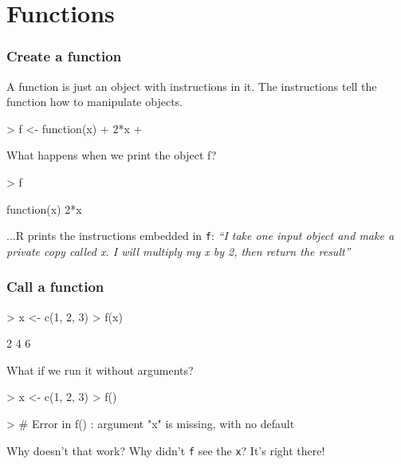 \documentclass{beamer}
\newcommand{\R}[1]{\texttt{#1}}
\begin{document}
\section{Functions}
\begin{frame}[fragile]
\frametitle{Create a function}
A function is just an object with instructions in it. The instructions tell the function how to manipulate objects.
\begin{Schunk}
\begin{Sinput}
> f <- function(x) {
+     2*x
+ }
\end{Sinput}
\end{Schunk}
\pause
What happens when we print the object f?
\begin{Schunk}
\begin{Sinput}
> f
\end{Sinput}
\end{Schunk}
\pause
\begin{Schunk}
\begin{Soutput}
function(x) {
    2*x
}
\end{Soutput}
\end{Schunk}
...R prints the instructions embedded in \R{f}: \textit{``I take one input object and make a private copy called x. I will multiply my x by 2, then return the result''}
\end{frame}


\begin{frame}[fragile]
\frametitle{Call a function}
\begin{Schunk}
\begin{Sinput}
> x <- c(1, 2, 3)
> f(x)
\end{Sinput}
\end{Schunk}
\pause
\begin{Schunk}
\begin{Soutput}
[1] 2 4 6
\end{Soutput}
\end{Schunk}
\pause
What if we run it without arguments?
\begin{Schunk}
\begin{Sinput}
> x <- c(1, 2, 3)
> f()
\end{Sinput}
\end{Schunk}
\pause
\begin{Schunk}
\begin{Sinput}
> # Error in f() : argument "x" is missing, with no default
\end{Sinput}
\end{Schunk}
Why doesn't that work? Why didn't \R{f} see the \R{x}? It's right there!
\end{frame}
\end{document}

